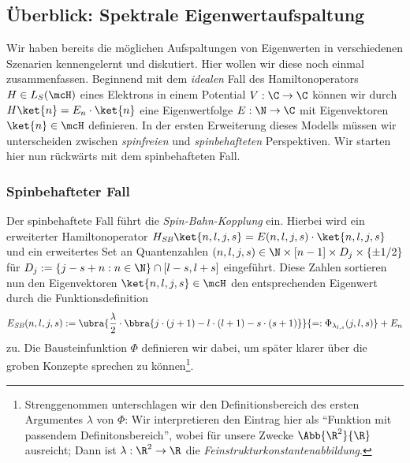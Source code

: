 \documentclass{subfiles}
\begin{document}
    \subsection{Überblick: Spektrale Eigenwertaufspaltung}
        Wir haben bereits die möglichen Aufspaltungen von Eigenwerten in verschiedenen Szenarien kennengelernt und diskutiert. Hier wollen wir diese noch einmal zusammenfassen. Beginnend mit dem \emph{idealen} Fall des Hamiltonoperators $H\in L_S(\mcH)$ eines Elektrons in einem Potential $V:\C\to\C$ können wir durch $H\ket{n} = E_n\cdot\ket{n}$ eine Eigenwertfolge $E:\N\to\C$ mit Eigenvektoren $\ket{n}\in\mcH$ definieren. In der ersten Erweiterung dieses Modells müssen wir unterscheiden zwischen \emph{spinfreien} und \emph{spinbehafteten} Perspektiven. Wir starten hier nun rückwärts mit dem spinbehafteten Fall. 

        \subsubsection*{Spinbehafteter Fall}
            Der spinbehaftete Fall führt die \emph{Spin-Bahn-Kopplung} ein. Hierbei wird ein erweiterter Hamiltonoperator $H_\textit{SB}\ket{n,l,j,s} = E(n,l,j,s)\cdot\ket{n,l,j,s}$ und ein erweitertes Set an Quantenzahlen $(n,l,j,s)\in\N\times[n-1]\times D_j\times\{\pm 1/2\}$ für $D_j:=\{j-s+n:n\in\N\}\cap[l-s,l+s]$ eingeführt. Diese Zahlen sortieren nun den Eigenvektoren $\ket{n,l,j,s}\in\mcH$ den entsprechenden Eigenwert durch die Funktionsdefinition
            \[
                E_\textit{SB}(n,l,j,s) := \ubra{\frac{\lambda}{2}\cdot\bbra{j\cdot(j+1) - l\cdot(l+1) - s\cdot(s+1)}}{=:\Phi_{\lambda_{l,s}}(j,l,s)} + E_n
            \] 
            zu. Die Bausteinfunktion $\Phi$ definieren wir dabei, um später klarer über die groben Konzepte sprechen zu können\footnote{Strenggenommen unterschlagen wir den Definitionsbereich des ersten Argumentes $\lambda$ von $\Phi$: Wir interpretieren den Eintrag hier als \enquote{Funktion mit passendem Definitonsbereich}, wobei für unsere Zwecke $\Abb{\R^2}{\R}$ ausreicht; Dann ist $\lambda:\R^2\to\R$ die \emph{Feinstrukturkonstantenabbildung}.}.
\end{document}
